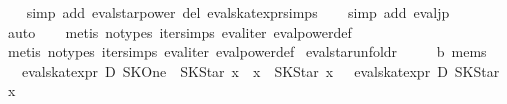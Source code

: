 \begin{isabellebody}
%
\isadelimproof
\ \ %
\endisadelimproof
%
\isatagproof
{}\isamarkupfalse%
\ {}simp\ add{}\ eval{}star{}power\ del{}\ eval{}skat{}expr{}simps{}{}{}{}\isanewline
\ \ \isamarkupfalse%
\ {}simp\ add{}\ eval{}jp{}\isanewline
\ \ \isamarkupfalse%
\ auto\isanewline
\ \ \isamarkupfalse%
\ {}metis\ {}no{}types{}\ iter{}simps{}{}{}\ eval{}iter\ eval{}power{}def{}\isanewline
\ \ \isamarkupfalse%
\ {}metis\ {}no{}types{}\ iter{}simps{}{}{}\ eval{}iter\ eval{}power{}def{}%
\endisatagproof
{\isafoldproof}%
%
\isadelimproof
\isanewline
%
\endisadelimproof
\isanewline
{}\isamarkupfalse%
\ eval{}star{}unfoldr{}\isanewline
\ \ \ {}\ {}{}\ {}{}b\ mems{}\isanewline
\ \ \ {}eval{}skat{}expr\ D\ {}SKOne\ {}\ SKStar\ x\ {}\ x\ {}\ SKStar\ x{}\ {}\ {}\ eval{}skat{}expr\ D\ {}SKStar\ x{}\ {}{}\isanewline

\end{isabellebody}
